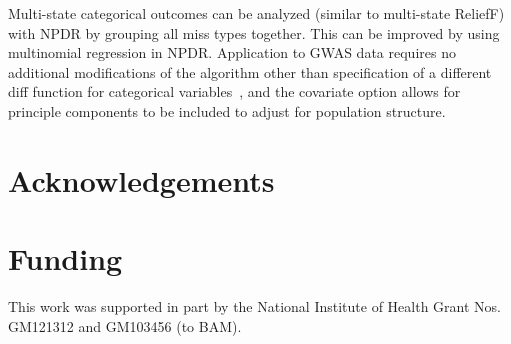 \documentclass[10pt]{article}
\begin{document}
Multi-state categorical outcomes can be analyzed (similar to multi-state ReliefF) with NPDR by grouping all miss types together. This can be improved by using multinomial regression in NPDR. Application to GWAS data requires no additional modifications of the algorithm other than specification of a different diff function for categorical variables~\cite{titv}, and the covariate option allows for principle components to be included to adjust for population structure. 

\section*{Acknowledgements}

\section*{Funding}
This work was supported in part by the National Institute of Health Grant Nos. GM121312 and GM103456 (to BAM). 


%

\end{document}
